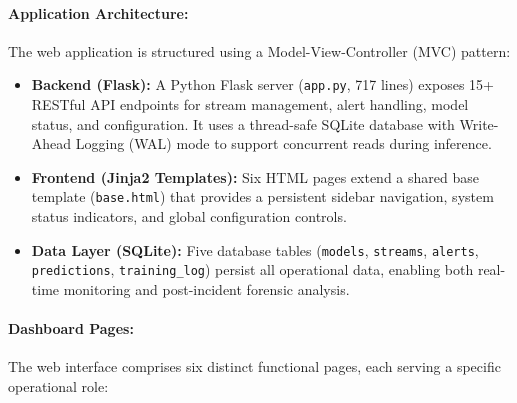 \documentclass[12pt]{article}
\begin{document}
\paragraph{Application Architecture:}
The web application is structured using a Model-View-Controller (MVC) pattern:
\begin{itemize}
    \item \textbf{Backend (Flask):} A Python Flask server (\texttt{app.py}, 717 lines) exposes 15+ RESTful API endpoints for stream management, alert handling, model status, and configuration. It uses a thread-safe SQLite database with Write-Ahead Logging (WAL) mode to support concurrent reads during inference.
    \item \textbf{Frontend (Jinja2 Templates):} Six HTML pages extend a shared base template (\texttt{base.html}) that provides a persistent sidebar navigation, system status indicators, and global configuration controls.
    \item \textbf{Data Layer (SQLite):} Five database tables (\texttt{models}, \texttt{streams}, \texttt{alerts}, \texttt{predictions}, \texttt{training\_log}) persist all operational data, enabling both real-time monitoring and post-incident forensic analysis.
\end{itemize}

\paragraph{Dashboard Pages:}
The web interface comprises six distinct functional pages, each serving a specific operational role:
\end{document}
